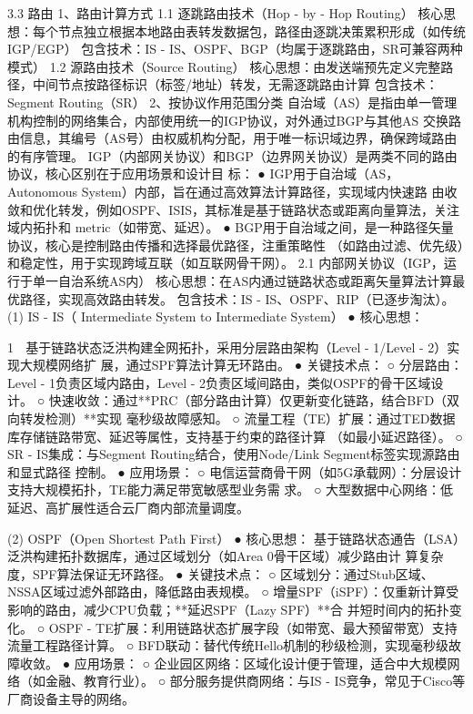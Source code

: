 
3.3 路由
1、路由计算方式
1.1 逐跳路由技术（Hop - by - Hop Routing）
核心思想：每个节点独立根据本地路由表转发数据包，路径由逐跳决策累积形成（如传统IGP/EGP）
包含技术：IS - IS、OSPF、BGP（均属于逐跳路由，SR可兼容两种模式）
1.2 源路由技术（Source Routing）
核心思想：由发送端预先定义完整路径，中间节点按路径标识（标签/地址）转发，无需逐跳路由计算
包含技术：Segment Routing（SR）
2、按协议作用范围分类
自治域（AS）是指由单一管理机构控制的网络集合，内部使用统一的IGP协议，对外通过BGP与其他AS
交换路由信息，其编号（AS号）由权威机构分配，用于唯一标识域边界，确保跨域路由的有序管理。
IGP（内部网关协议）和BGP（边界网关协议）是两类不同的路由协议，核心区别在于应用场景和设计目
标：
  ● IGP用于自治域（AS，Autonomous System）内部，旨在通过高效算法计算路径，实现域内快速路
    由收敛和优化转发，例如OSPF、ISIS，其标准是基于链路状态或距离向量算法，关注域内拓扑和
    metric（如带宽、延迟）。
  ● BGP用于自治域之间，是一种路径矢量协议，核心是控制路由传播和选择最优路径，注重策略性
    （如路由过滤、优先级）和稳定性，用于实现跨域互联（如互联网骨干网）。
2.1 内部网关协议（IGP，运行于单一自治系统AS内）
核心思想：在AS内通过链路状态或距离矢量算法计算最优路径，实现高效路由转发。
包含技术：IS - IS、OSPF、RIP（已逐步淘汰）。
(1) IS - IS（ Intermediate System to Intermediate System）
  ● 核心思想：



                                                           1
   基于链路状态泛洪构建全网拓扑，采用分层路由架构（Level - 1/Level - 2）实现大规模网络扩
   展，通过SPF算法计算无环路由。
 ● 关键技术点：
    ○ 分层路由：Level - 1负责区域内路由，Level - 2负责区域间路由，类似OSPF的骨干区域设
      计。
    ○ 快速收敛：通过**PRC（部分路由计算）仅更新变化链路，结合BFD（双向转发检测）**实现
      毫秒级故障感知。
    ○ 流量工程（TE）扩展：通过TED数据库存储链路带宽、延迟等属性，支持基于约束的路径计算
      （如最小延迟路径）。
    ○ SR - IS集成：与Segment Routing结合，使用Node/Link Segment标签实现源路由和显式路径
      控制。
 ● 应用场景：
    ○ 电信运营商骨干网（如5G承载网）：分层设计支持大规模拓扑，TE能力满足带宽敏感型业务需
      求。
    ○ 大型数据中心网络：低延迟、高扩展性适合云厂商内部流量调度。


(2) OSPF（Open Shortest Path First）
  ● 核心思想：
     基于链路状态通告（LSA）泛洪构建拓扑数据库，通过区域划分（如Area 0骨干区域）减少路由计
     算复杂度，SPF算法保证无环路径。
  ● 关键技术点：
      ○ 区域划分：通过Stub区域、NSSA区域过滤外部路由，降低路由表规模。
      ○ 增量SPF（iSPF）：仅重新计算受影响的路由，减少CPU负载；**延迟SPF（Lazy SPF）**合
        并短时间内的拓扑变化。
      ○ OSPF - TE扩展：利用链路状态扩展字段（如带宽、最大预留带宽）支持流量工程路径计算。
      ○ BFD联动：替代传统Hello机制的秒级检测，实现毫秒级故障收敛。
  ● 应用场景：
      ○ 企业园区网络：区域化设计便于管理，适合中大规模网络（如金融、教育行业）。
      ○ 部分服务提供商网络：与IS - IS竞争，常见于Cisco等厂商设备主导的网络。


